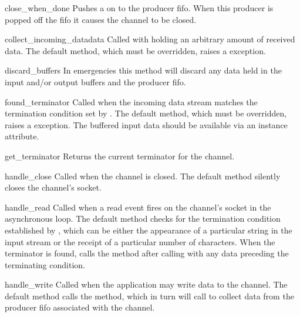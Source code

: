 \begin{methoddesc}{close_when_done}{}
  Pushes a  on to the producer fifo. When this producer is
  popped off the fifo it causes the channel to be closed.
\end{methoddesc}

\begin{methoddesc}{collect_incoming_data}{data}
  Called with  holding an arbitrary amount of received data.
  The default method, which must be overridden, raises a  exception.
\end{methoddesc}

\begin{methoddesc}{discard_buffers}{}
  In emergencies this method will discard any data held in the input and/or
  output buffers and the producer fifo.
\end{methoddesc}

\begin{methoddesc}{found_terminator}{}
  Called when the incoming data stream  matches the termination condition
  set by . The default method, which must be overridden,
  raises a  exception. The buffered input data should
  be available via an instance attribute.
\end{methoddesc}

\begin{methoddesc}{get_terminator}{}
  Returns the current terminator for the channel.
\end{methoddesc}

\begin{methoddesc}{handle_close}{}
  Called when the channel is closed. The default method silently closes
  the channel's socket.
\end{methoddesc}

\begin{methoddesc}{handle_read}{}
  Called when a read event fires on the channel's socket in the
  asynchronous loop. The default method checks for the termination
  condition established by , which can be either
  the appearance of a particular string in the input stream or the receipt
  of a particular number of characters. When the terminator is found,
   calls the  method after
  calling  with any data preceding the
  terminating condition.
\end{methoddesc}

\begin{methoddesc}{handle_write}{}
  Called when the application may write data to the channel.  
  The default method calls the  method, which in turn
  will call  to collect data from the producer
  fifo associated with the channel.
\end{methoddesc}

